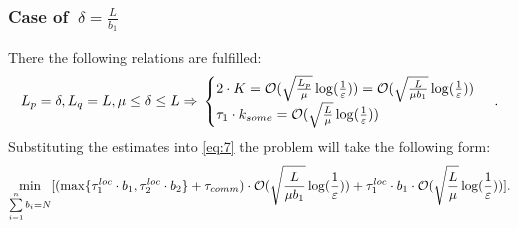 \documentclass{article}
\begin{document}
\subsubsection{Case of $~\delta = \frac{L}{b_1}$}
There the following relations are fulfilled:
\begin{equation}
    \notag
    L_p = \delta, L_q = L, \mu \leq \delta \leq L \Rightarrow 
    \\
    \notag
    \begin{cases}
      2\cdot K = \mathcal O(\sqrt{\frac{L_p}{\mu}}\log(\frac{1}{\varepsilon}))  = \mathcal O(\sqrt{\frac{L}{\mu b_1}}\log(\frac{1}{\varepsilon}))\\
      \tau_1\cdot k_{some} = \mathcal O(\sqrt{\frac{L}{\mu}}\log(\frac{1}{\varepsilon}))
    \end{cases}\,.
\end{equation}
Substituting the estimates into \eqref{eq:7}  the problem will take the following form:
\begin{equation}
    \notag
    \underset{\sum\limits_{i = 1}^{n} b_i = N}{\min}[(\max\{\tau_1^{loc}\cdot b_1, \tau_2^{loc}\cdot b_2\} + \tau_{comm}) \cdot \mathcal O(\sqrt{\frac{L}{\mu {b_1}}}\log(\frac{1}{\varepsilon})) + \tau_1^{loc}\cdot b_1 \cdot \mathcal O(\sqrt{\frac{L}{\mu}}\log(\frac{1}{\varepsilon}))].
\end{equation}
\end{document}
